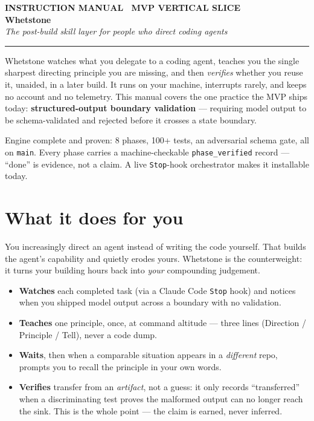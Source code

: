 \documentclass[11pt]{article}
\newcommand{\code}[1]{\textcolor{ink}{\texttt{#1}}}
\begin{document}
\begin{center}
{\footnotesize\bfseries\color{edge}\MakeUppercase{Instruction Manual \textbullet\ MVP vertical slice}}\\[0.4em]
{\Huge\bfseries\color{ink} Whetstone}\\[0.3em]
{\large\color{steel}\itshape The post-build skill layer for people who direct coding agents}\\[0.6em]
{\color{rule}\rule{\textwidth}{1pt}}
\end{center}

\vspace{0.3em}
Whetstone watches what you delegate to a coding agent, teaches you the single sharpest
directing principle you are missing, and then \emph{verifies} whether you reuse it,
unaided, in a later build. It runs on your machine, interrupts rarely, and keeps no
account and no telemetry. This manual covers the one practice the MVP ships today:
\textbf{structured-output boundary validation} --- requiring model output to be
schema-validated and rejected before it crosses a state boundary.

\begin{ok}
Engine complete and proven: 8 phases, 100+ tests, an adversarial schema gate, all on
\code{main}. Every phase carries a machine-checkable \code{phase\_verified} record --- ``done''
is evidence, not a claim. A live \code{Stop}-hook orchestrator makes it installable today.
\end{ok}

\section{What it does for you}

You increasingly direct an agent instead of writing the code yourself. That builds the
agent's capability and quietly erodes yours. Whetstone is the counterweight: it turns your
building hours back into \emph{your} compounding judgement.

\begin{itemize}
\item \textbf{Watches} each completed task (via a Claude Code \code{Stop} hook) and notices
      when you shipped model output across a boundary with no validation.
\item \textbf{Teaches} one principle, once, at command altitude --- three lines
      (Direction / Principle / Tell), never a code dump.
\item \textbf{Waits}, then when a comparable situation appears in a \emph{different} repo,
      prompts you to recall the principle in your own words.
\item \textbf{Verifies} transfer from an \emph{artifact}, not a guess: it only records
      ``transferred'' when a discriminating test proves the malformed output can no longer
      reach the sink. This is the whole point --- the claim is earned, never inferred.
\end{itemize}
\end{document}
